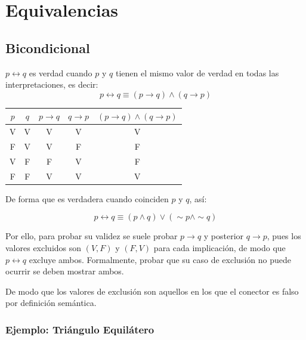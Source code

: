 \chapter{ Equivalencias }

  \section{Bicondicional}

  \begin{minipage}[t]{0.48\textwidth}
  \begin{definition}[title={Bicondicional}]
  $p \leftrightarrow q$ es verdad cuando $p$ y $q$ tienen el mismo valor
  de verdad en todas las interpretaciones, es decir:
  \begin{equation}
  p \leftrightarrow q \equiv (p \to q) \land (q \to p)
  \end{equation}
  \end{definition}
  \end{minipage}

  \begin{minipage}[t]{0.48\textwidth}
  \begin{tabular}{c|c|c|c|c}
  $p$ & $q$ & $p \to q$ & $q \to p$ & $(p \to q) \land (q \to p)$ \\
  \hline
  V & V & V & V & V \\
  F & V & V & F & F \\
  V & F & F & V & F \\
  F & F & V & V & V \\
  \end{tabular}
  \end{minipage}

  De forma que es verdadera cuando coinciden $p$ y $q$, así:

  \begin{equation}
  p \leftrightarrow q \equiv (p \land q) \lor (\sim p \land \sim q)
  \end{equation}

  Por ello, para probar su validez se suele probar $p \to q$ y posterior
  $q \to p$, pues los valores excluidos son $(V,F)$ y $(F,V)$ para cada
  implicación, de modo que $p \leftrightarrow q$ excluye ambos.
  Formalmente, probar que su caso de exclusión no puede ocurrir se deben
  mostrar ambos.

  De modo que los valores de exclusión son aquellos en los que el conector
  es falso por definición semántica.

  \subsection{Ejemplo: Triángulo Equilátero}

